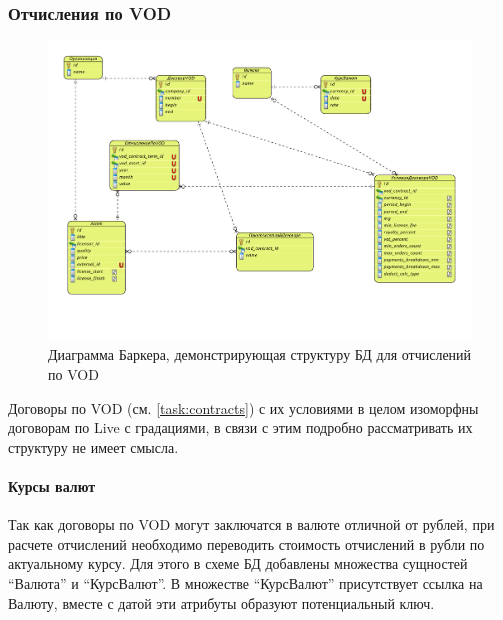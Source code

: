 \subsubsection{Отчисления по VOD}
\begin{figure}[!ht]
\begin{center}
\vspace{-0.5cm}
\includegraphics[scale=0.65, trim=10mm 28mm 0mm 10mm, clip]{../resources/uml/VOD_DEDUCT.pdf}
\caption{Диаграмма Баркера, демонстрирующая структуру БД для отчислений по VOD}
\label{gr:vod_deduct}
\end{center} 
\end{figure}

Договоры по VOD (см. \ref{task:contracts}) с их условиями в целом изоморфны договорам по Live с градациями, в связи с этим
подробно рассматривать их структуру не имеет смысла. 

\paragraph{Курсы валют} Так как договоры по VOD могут заключатся в валюте отличной от рублей,
при расчете отчислений необходимо переводить стоимость отчислений в рубли по актуальному курсу.
Для этого в схеме БД добавлены множества сущностей ``Валюта'' и ``КурсВалют''. В множестве
``КурсВалют'' присутствует ссылка на Валюту, вместе с датой эти атрибуты образуют потенциальный ключ.

